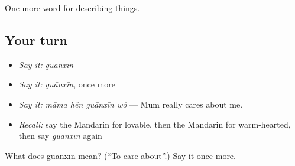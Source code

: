 \begin{grammarlens}[title={What you've built}]
One more word for describing things.
\end{grammarlens}

\subsection*{Your turn}
\begin{itemize}
\raggedright
  \item \emph{Say it:} \emph{guānxīn}
  \item \emph{Say it:} \emph{guānxīn}, once more
  \item \emph{Say it:} \emph{māma hěn guānxīn wǒ} — Mum really cares about me.
  \item \emph{Recall:} say the Mandarin for lovable, then the Mandarin for warm-hearted, then say \emph{guānxīn} again
\end{itemize}

\begin{tcolorbox}[breakable,colback=teal!4,colframe=teal!35!black,title={Before you move on}]
What does guānxīn mean? (\textquotedblleft{}To care about\textquotedblright{}.) Say it once more.
\end{tcolorbox}
